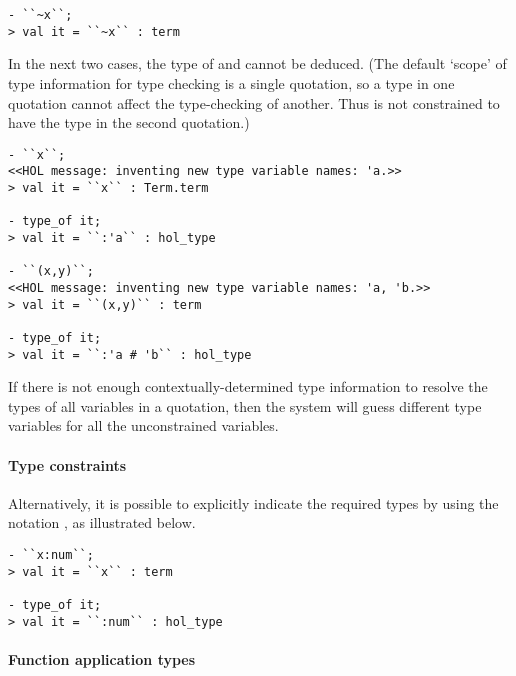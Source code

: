 \begin{session}
\begin{verbatim}
- ``~x``;
> val it = ``~x`` : term
\end{verbatim}
\end{session}

In the next two cases, the type of  and  cannot be
deduced.
(The default `scope' of type information for type checking is a single quotation, so a type in one quotation cannot affect the type-checking of another.
Thus  is not constrained to have the type  in the second quotation.)

\begin{session}
\begin{verbatim}
- ``x``;
<<HOL message: inventing new type variable names: 'a.>>
> val it = ``x`` : Term.term

- type_of it;
> val it = ``:'a`` : hol_type

- ``(x,y)``;
<<HOL message: inventing new type variable names: 'a, 'b.>>
> val it = ``(x,y)`` : term

- type_of it;
> val it = ``:'a # 'b`` : hol_type
\end{verbatim}
\end{session}

If there is not enough contextually-determined type information to resolve the types of all variables in a quotation, then the system will guess different type variables for all the unconstrained variables.

\paragraph{Type constraints}

Alternatively, it is possible to explicitly indicate the required types by using the notation , as illustrated below.

\begin{session}
\begin{verbatim}
- ``x:num``;
> val it = ``x`` : term

- type_of it;
> val it = ``:num`` : hol_type
\end{verbatim}
\end{session}

\paragraph{Function application types}

